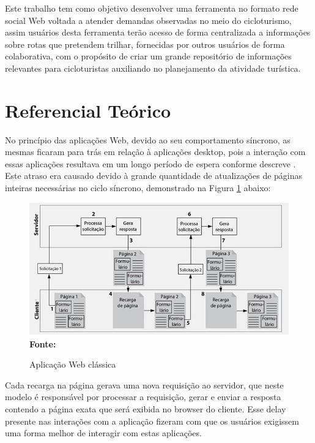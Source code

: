 Este trabalho tem como objetivo desenvolver uma ferramenta no formato rede social Web voltada a atender demandas observadas no meio do cicloturismo,
assim usuários desta ferramenta terão acesso de forma centralizada a informações sobre rotas que pretendem trilhar, fornecidas por outros usuários
de forma colaborativa, com o propósito de criar um grande repositório de informações relevantes para cicloturistas auxiliando no planejamento da 
atividade turística.

\section{\esp Referencial Teórico}
No princípio das aplicações Web, devido ao seu comportamento síncrono, as mesmas ficaram para trás em relação à aplicações desktop, pois a interação 
com essas aplicações resultava em um longo período de espera conforme descreve \cite{deitelAjax}. Este atraso era causado devido à grande quantidade 
de atualizações de páginas inteiras necessárias no ciclo síncrono, demonstrado na Figura \ref{fig:arquitetura_web_tradicional} abaixo: 

\begin{figure}[!ht]
	\centering	
	\caption[\hspace{0.1cm}Aplicação Web clássica.]{Aplicação Web clássica}
	  \vspace{-0.4cm}
	\includegraphics[width=.8\textwidth]{figuras/arquitetura_web_tradicional.png}
	 \vspace{-0.3cm}
	\\\textbf{\footnotesize Fonte: \cite{deitelAjax}}
	\label{fig:arquitetura_web_tradicional}
\end{figure}

Cada recarga na página gerava uma nova requisição ao servidor, que neste modelo é responsável por processar a requisição, gerar e enviar a resposta 
contendo a página exata que será exibida no browser do cliente. Esse delay presente nas interações com a aplicação fizeram com que os usuários 
exigissem uma forma melhor de interagir com estas aplicações. 

